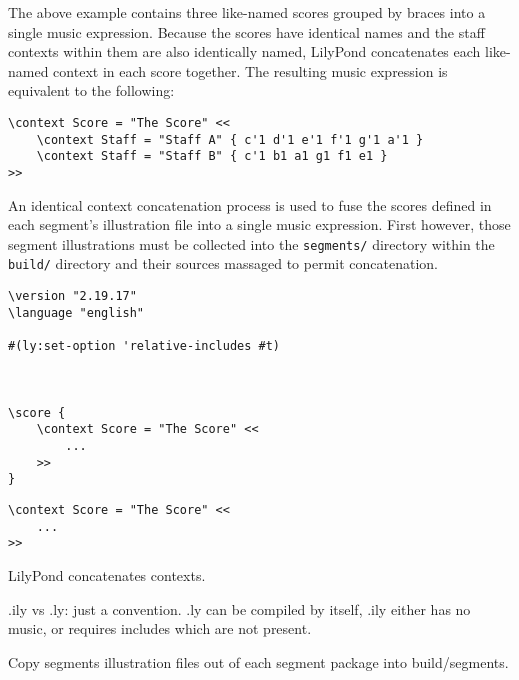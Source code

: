 \noindent The above example contains three like-named scores grouped by braces
into a single music expression. Because the scores have identical names and the
staff contexts within them are also identically named, LilyPond concatenates
each like-named context in each score together. The resulting music expression
is equivalent to the following:

\begin{singlespacing}
\vspace{-0.5\baselineskip}
\begin{verbatim}
\context Score = "The Score" <<
    \context Staff = "Staff A" { c'1 d'1 e'1 f'1 g'1 a'1 }
    \context Staff = "Staff B" { c'1 b1 a1 g1 f1 e1 }
>>
\end{verbatim}
\end{singlespacing}

\noindent An identical context concatenation process is used to fuse the scores
defined in each segment's illustration file into a single music expression.
First however, those segment illustrations must be collected into the
\texttt{segments/} directory within the \texttt{build/} directory and their
sources massaged to permit concatenation.

\begin{singlespacing}
\vspace{-0.5\baselineskip}
\begin{verbatim}
\version "2.19.17"
\language "english"

#(ly:set-option 'relative-includes #t)



\score {
    \context Score = "The Score" <<
        ...
    >>
}
\end{verbatim}
\end{singlespacing}

\begin{singlespacing}
\vspace{-0.5\baselineskip}
\begin{verbatim}
\context Score = "The Score" <<
    ...
>>
\end{verbatim}
\end{singlespacing}

LilyPond concatenates contexts.

.ily vs .ly: just a convention. .ly can be compiled by itself, .ily either has
no music, or requires includes which are not present.

Copy segments illustration files out of each segment package into
build/segments.

